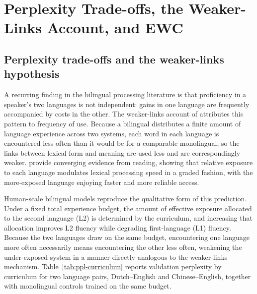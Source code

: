 \section{Perplexity Trade-offs, the Weaker-Links Account, and EWC}
\label{app:ppl-tradeoff}

\subsection{Perplexity trade-offs and the weaker-links hypothesis}

A recurring finding in the bilingual processing literature is that
proficiency in a speaker's two languages is not independent: gains in
one language are frequently accompanied by costs in the other. The
weaker-links account of \citet{gollan2008weaker} attributes this
pattern to frequency of use. Because a bilingual distributes a finite
amount of language experience across two systems, each word in each
language is encountered less often than it would be for a comparable
monolingual, so the links between lexical form and meaning are used
less and are correspondingly weaker. \citet{whitford2015second}
provide converging evidence from reading, showing that relative
exposure to each language modulates lexical processing speed in a
graded fashion, with the more-exposed language enjoying faster and more
reliable access.

Human-scale bilingual \beetle{} models reproduce the qualitative form
of this prediction. Under a fixed total experience budget, the amount
of effective exposure allocated to the second language (L2) is
determined by the curriculum, and increasing that allocation improves
L2 fluency while degrading first-language (L1) fluency. Because the two
languages draw on the same budget, encountering one language more often
necessarily means encountering the other less often, weakening the
under-exposed system in a manner directly analogous to the weaker-links
mechanism. Table~\ref{tab:ppl-curriculum} reports validation perplexity
by curriculum for two language pairs, Dutch--English and
Chinese--English, together with monolingual controls trained on the
same budget.

